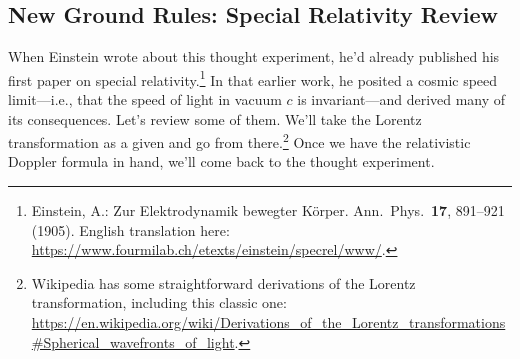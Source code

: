 \documentclass[12pt]{article}
\begin{document}
\subsection{New Ground Rules: Special Relativity Review}\label{ssec:sr}

When Einstein wrote about this thought experiment, he'd already published his first paper on special relativity.\footnote{\label{fn:ep}Einstein, A.: Zur Elektrodynamik bewegter K\"orper. Ann.\ Phys.\ \textbf{17}, 891--921 (1905). English translation here: \url{https://www.fourmilab.ch/etexts/einstein/specrel/www/}.} In that earlier work, he posited a cosmic speed limit---i.e., that the speed of light in vacuum $c$ is invariant---and derived many of its consequences. Let's review some of them. We'll take the Lorentz transformation as a given and go from there.\footnote{Wikipedia has some straightforward derivations of the Lorentz transformation, including this classic one: \url{https://en.wikipedia.org/wiki/Derivations_of_the_Lorentz_transformations\#Spherical_wavefronts_of_light}.} Once we have the relativistic Doppler formula in hand, we'll come back to the thought experiment.
\end{document}
